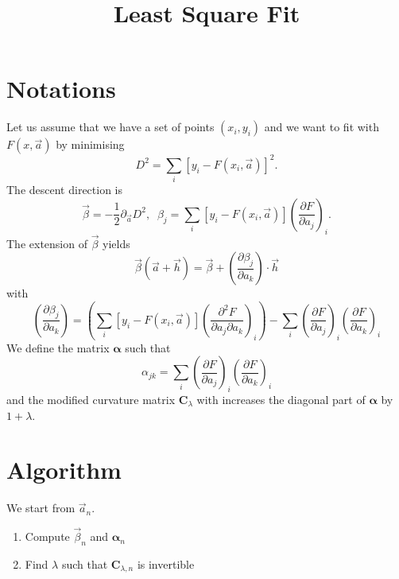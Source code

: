 \documentclass[aps]{revtex4}
\newcommand{\mymat}[1]{\boldsymbol{#1}}
\begin{document}
\title{Least Square Fit}
\maketitle
	
\section{Notations}
Let us assume that we have a set of points $(x_i,y_i)$ and we want to fit
with $F(x,\vec{a})$ by minimising
\begin{equation}
	D^2 = \sum_i\left[ y_i - F\left(x_i,\vec{a}\right)\right]^2.
\end{equation}
The descent direction is
\begin{equation}
	\vec{\beta} = -\dfrac{1}{2}\partial_{\vec{a}} D^2,
	 \;\; \beta_j = \sum_i \left[y_i - F\left(x_i,\vec{a}\right)\right] \left(\dfrac{\partial F}{\partial a_j}\right)_i.
\end{equation}
The extension of $\vec\beta$ yields
\begin{equation}
	\vec{\beta}\left(\vec{a}+\vec{h}\right) = \vec{\beta} + \left(\dfrac{\partial \beta_j}{\partial a_k}\right) \cdot \vec{h}
\end{equation}
with
\begin{equation}
	\left(\dfrac{\partial \beta_j}{\partial a_k}\right) = 
	\left(
	 \sum_i \left[y_i - F\left(x_i,\vec{a}\right)\right] \left(\dfrac{\partial^2 F}{\partial a_j\partial a_k}\right)_i
	 \right) - \sum_i \left(\dfrac{\partial F}{\partial a_j}\right)_i\left(\dfrac{\partial F}{\partial a_k}\right)_i
\end{equation}
We define the matrix $\mymat{\alpha}$ such that
\begin{equation}
		\alpha_{jk} = \sum_i \left(\dfrac{\partial F}{\partial a_j}\right)_i\left(\dfrac{\partial F}{\partial a_k}\right)_i
\end{equation}
and the modified curvature matrix $\mymat{C}_\lambda$ with increases the diagonal part of $\mymat{\alpha}$ by $1+\lambda$.

\section{Algorithm}

We start from $\vec{a}_n$.
\begin{enumerate}
	\item Compute $\vec{\beta}_n$ and $\mymat{\alpha}_n$
	\item Find $\lambda$ such that $\mymat{C}_{\lambda,n}$ is invertible
\end{enumerate}
\end{document}
